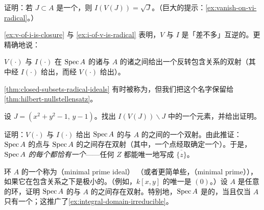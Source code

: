\begin{exercise}[容易的练习]\label{ex:i-of-v-is-radical}
证明：若 $J\subset A$ 是一个\trIdeal，则 $I(V(J))=\sqrt{J}$。（巨大的提示：\cref{ex:vanish-on-vi-radical}。）
\end{exercise}

\cref{ex:v-of-i-is-closure} 与 \cref{ex:i-of-v-is-radical} 表明，$V$ 与 $I$
是「差不多」互逆的。更精确地说：

\begin{theorem}\label{thm:closed-subsets-radical-ideals}
$V(\cdot)$ 与 $I(\cdot)$ 在 $\operatorname{Spec} A$ 的诸\trClosedSubset{}与 $A$ 的诸\trRadicalIdeal{}之间给出一个反转包含关系的双射（其中\trClosedSubset{}经 $I(\cdot)$ 给出\trRadicalIdeal，而\trRadicalIdeal{}经 $V(\cdot)$ 给出\trClosedSubset）。
\end{theorem}

\cref{thm:closed-subsets-radical-ideals} 有时被称为\trHilbert{}\trNullstellensatz，但我们把这个名字保留给 \cref{thm:hilbert-nullstellensatz}。

\begin{exercise}\label{ex:i-of-v-exceeds-j}
设 $J=(x^2+y^2-1,\,y-1)$。找出 $I(V(J))\smallsetminus J$ 中的一个元素，并给出证明。
\end{exercise}

\begin{exercise}\label{ex:irreducible-prime-bijection}
证明：$V(\cdot)$ 与 $I(\cdot)$ 给出 $\operatorname{Spec} A$ 的\emph{\trIrreducible{}\trClosedSubset}与 $A$ 的\emph{\trPrimeIdeal}之间的一个双射。由此推证：$\operatorname{Spec} A$ 的点与 $\operatorname{Spec} A$ 的\trIrreducible{}\trClosedSubset{}之间存在双射（其中，一个点经取\trClosure{}确定一个\trIrreducible{}\trClosedSubset）。于是，\emph{$\operatorname{Spec} A$ 的每个\trIrreducible{}\trClosedSubset{}都恰有一个\trGenericPoint}——任何\trIrreducible{}\trClosedSubset{} $Z$ 都能唯一地写成 $\overline{\{z\}}$。
\end{exercise}

\begin{exercise}[练习兼定义]\label{ex:minimal-prime-ideals}
环 $A$ 的一个\trPrimeIdeal{}称为\textbf{\trMinimalPrimeIdeal{}}（minimal prime ideal）
（或者更简单些，\textbf{\trMinimalPrime{}}（minimal prime）），如果它在包含关系之下是极小的。（例如，$k[x,y]$ 的唯一\trMinimalPrimeIdeal{}是 $(0)$。）设 $A$ 是任意的环，证明 $\operatorname{Spec} A$ 的\trIrreducibleComponent{}与 $A$ 的\trMinimalPrimeIdeal{}之间存在双射。特别地，$\operatorname{Spec} A$ 是\trIrreducible{}的，当且仅当 $A$ 只有一个\trMinimalPrimeIdeal{}；这推广了\cref{ex:integral-domain-irreducible}。
\end{exercise}

